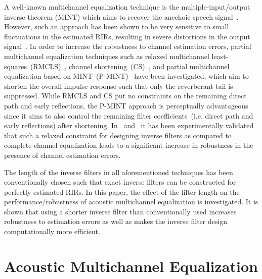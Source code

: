 \documentclass{article}
\begin{document}
A well-known multichannel equalization technique is the multiple-input/output inverse theorem (MINT) which aims to recover the anechoic speech signal~\cite{Miyoshi_ITASS_1988}. 
However, such an approach has been shown to be very sensitive to small fluctuations in the estimated RIRs, resulting in severe distortions in the output signal~\cite{Radlovic_ITSA_2000}.
In order to increase the robustness to channel estimation errors, partial multichannel equalization techniques such as relaxed multichannel least-squares~(RMCLS)~\cite{Zhang_IWAENC_2010}, channel shortening~(CS)~\cite{Kallinger_ICASSP_2006}, and partial multichannel equalization based on MINT~(P-MINT)~\cite{Kodrasi_ICASSP_2012} have been investigated, which aim to shorten the overall impulse response such that only the reverberant tail is suppressed.
While RMCLS and CS put no constraints on the remaining direct path and early reflections, the P-MINT approach is perceptually advantageous since it aims to also control the remaining filter coefficients~(i.e. direct path and early reflections) after shortening.
In~\cite{Kodrasi_ICASSP_2012} and~\cite{Zhang_IWAENC_2010} it has been experimentally validated that such a relaxed constraint for designing inverse filters as compared to complete channel equalization leads to a significant increase in robustness in the presence of channel estimation errors. 

The length of the inverse filters in all aforementioned techniques has been conventionally chosen such that exact inverse filters can be constructed for perfectly estimated RIRs.
In this paper, the effect of the filter length on the performance/robustness of acoustic multichannel equalization is investigated.
It is shown that using a shorter inverse filter than conventionally used increases robustness to estimation errors as well as makes the inverse filter design computationally more efficient.

\vspace{-0.1cm}
\section{Acoustic Multichannel Equalization}
\label{sec: intro}
\vspace{-0.2cm}
\end{document}
